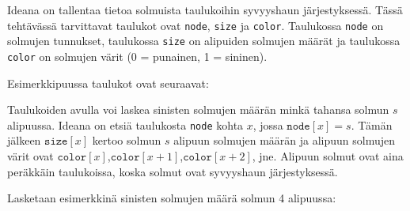 Ideana on tallentaa tietoa solmuista taulukoihin
syvyyshaun järjestyksessä.
Tässä tehtävässä tarvittavat taulukot ovat
\texttt{node}, \texttt{size} ja \texttt{color}.
Taulukossa \texttt{node} on solmujen tunnukset,
taulukossa \texttt{size} on alipuiden solmujen määrät
ja taulukossa \texttt{color} on solmujen värit
(0 = punainen, 1 = sininen).

Esimerkkipuussa taulukot ovat seuraavat:
\begin{center}
\end{center}

Taulukoiden avulla voi laskea
sinisten solmujen määrän minkä tahansa solmun $s$ alipuussa.
Ideana on etsiä taulukosta \texttt{node}
kohta $x$, jossa $\texttt{node}[x]=s$.
Tämän jälkeen $\texttt{size}[x]$ kertoo solmun $s$
alipuun solmujen määrän ja alipuun solmujen
värit ovat $\texttt{color}[x]$,$\texttt{color}[x+1]$,$\texttt{color}[x+2]$, jne.
Alipuun solmut ovat aina peräkkäin taulukoissa,
koska solmut ovat syvyyshaun järjestyksessä.

Lasketaan esimerkkinä sinisten solmujen määrä solmun 4
alipuussa:

